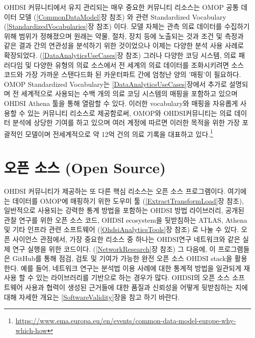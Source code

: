 \documentclass[11pt]{book}
\let\rmarkdownfootnote\footnote%
\def\footnote{\protect\rmarkdownfootnote}
\theoremstyle{definition}
\theoremstyle{definition}
\theoremstyle{definition}
\theoremstyle{remark}
\begin{document}

OHDSI 커뮤니티에서 유지 관리되는 매우 중요한 커뮤니티 리소스는 OMOP 공통
데이터 모델 (\ref{CommonDataModel}장 참조) 와 관련 Standardized
Vocabulary (\ref{StandardizedVocabularies}장 참조) 이다. 모델 자체는
관측 의료 데이터를 수집하기 위해 범위가 정해졌으며 원래는 약물, 절차,
장치 등에 노출되는 것과 조건 및 측정과 같은 결과 간의 연관성을 분석하기
위한 것이었으나 이제는 다양한 분석 사용 사례로 확장되었다.
(\ref{DataAnalyticsUseCases}장 참조) 그러나 다양한 코딩 시스템, 의료
패러다임 및 다양한 유형의 의료 소스에서 전 세계의 의료 데이터를
조화시키려면 소스 코드와 가장 가까운 스탠다드화 된 카운터파트 간에
엄청난 양의 '매핑'이 필요하다. OMOP Standardized Vocabulary는
\ref{DataAnalyticsUseCases}장에서 추가로 설명되며 전 세계적으로 사용되는
수백 개의 의료 코딩 시스템의 매핑을 포함하고 있으며 OHDSI Athena 툴을
통해 열람할 수 있다. 이러한 vocabulary와 매핑을 자유롭게 사용할 수 있는
커뮤니티 리소스로 제공함로써, OMOP와 OHDSI커뮤니티는 의료 데이터 분석에
상당한 기여를 하고 있으며 여러 계정에 따르면 이러한 목적을 위한 가장
포괄적인 모델이며 전세계적으로 약 12억 건의 의료 기록을 대표하고
있다.\footnote{\url{https://www.ema.europa.eu/en/events/common-data-model-europe-why-which-how}}
\citep{garza_2016}

\section{오픈 소스 (Open Source)}\label{--open-source}


OHDSI 커뮤니티가 제공하는 또 다른 핵심 리소스는 오픈 소스 프로그램이다.
여기에는 데이터를 OMOP에 매핑하기 위한 도우미 툴
(\ref{ExtractTransformLoad}장 참조), 일반적으로 사용되는 강력한 통계
방법을 포함하는 OHDSI 방법 라이브러리, 공개된 관찰 연구를 위한 오픈 소스
코드, OHDSI ecosystem을 뒷받침하는 ATLAS, Athena 및 기타 인프라 관련
소프트웨어 (\ref{OhdsiAnalyticsTools}장 참조) 로 나눌 수 있다. 오픈
사이언스 관점에서, 가장 중요한 리소스 중 하나는 OHDSI연구 네트워크와
같은 실제 연구 실행을 위한 코드이다. (\ref{NetworkResearch}장 참조) 그
다음에, 이 프로그램들은 GitHub를 통해 점검, 검토 및 기여가 가능한 완전
오픈 소스 OHDSI stack을 활용한다. 예를 들어, 네트워크 연구는 분석법 이용
사례에 대한 통계적 방법을 일관되게 재사용 할 수 있는 라이브러리를
기반으로 하는 경우가 많다. OHDSI의 오픈 소스 소프트웨어 사용과 협력이
생성된 근거들에 대한 품질과 신뢰성을 어떻게 뒷받침하는 지에 대해 자세한
개요는 \ref{SoftwareValidity}장을 참고 하기 바란다.
\end{document}
